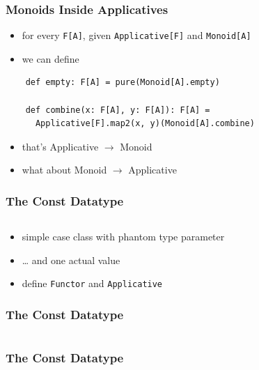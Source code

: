 \documentclass[aspectratio=169]{beamer}
\begin{document}
\begin{frame}[fragile]
  \frametitle{Monoids Inside Applicatives}
  \begin{itemize}
  \item for every \texttt{F[A]}, given \texttt{Applicative[F]} and \texttt{Monoid[A]}
  \item we can define
  \end{itemize}
  \vspace{5mm}
  \begin{verbatim}
    def empty: F[A] = pure(Monoid[A].empty)

    def combine(x: F[A], y: F[A]): F[A] =
      Applicative[F].map2(x, y)(Monoid[A].combine)
  \end{verbatim}
  \begin{itemize}
  \item that's Applicative $\rightarrow{}$ Monoid
  \item what about Monoid $\rightarrow{}$ Applicative
  \end{itemize}
\end{frame}

\begin{frame}[fragile]
  \frametitle{The Const Datatype}
  \begin{center}
    \inputminted[fontsize=\small]{scala}{snippets/const-def.scala}
  \end{center}
  \vspace{5mm}
  \begin{itemize}
  \item simple case class with phantom type parameter
  \item \ldots{} and one actual value
  \item define \texttt{Functor} and \texttt{Applicative}
  \end{itemize}
\end{frame}

\begin{frame}[fragile]
  \frametitle{The Const Datatype}
  \begin{center}
    \inputminted[fontsize=\small]{scala}{snippets/const-try-applicative.scala}
  \end{center}
\end{frame}

\begin{frame}[fragile]
  \frametitle{The Const Datatype}
  \begin{center}
    \inputminted[fontsize=\small, highlightlines={1,6,8}]{scala}{snippets/const-applicative.scala}
  \end{center}
\end{frame}
\end{document}
